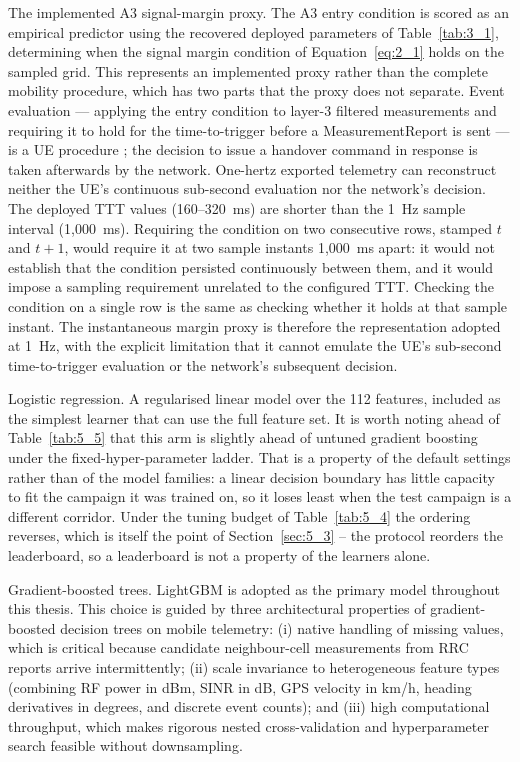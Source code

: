 The implemented A3 signal-margin proxy. The A3 entry condition is scored as an empirical predictor using the recovered deployed parameters of Table~\ref{tab:3_1}, determining when the signal margin condition of Equation~\eqref{eq:2_1} holds on the sampled grid. This represents an implemented proxy rather than the complete mobility procedure, which has two parts that the proxy does not separate. Event evaluation --- applying the entry condition to layer-3 filtered measurements and requiring it to hold for the time-to-trigger before a MeasurementReport is sent --- is a UE procedure \cite{ref1}; the decision to issue a handover command in response is taken afterwards by the network. One-hertz exported telemetry can reconstruct neither the UE's continuous sub-second evaluation nor the network's decision. The deployed TTT values (160--320~ms) are shorter than the 1~Hz sample interval (1,000~ms). Requiring the condition on two consecutive rows, stamped $t$ and $t+1$, would require it at two sample instants 1,000~ms apart: it would not establish that the condition persisted continuously between them, and it would impose a sampling requirement unrelated to the configured TTT. Checking the condition on a single row is the same as checking whether it holds at that sample instant. The instantaneous margin proxy is therefore the representation adopted at 1~Hz, with the explicit limitation that it cannot emulate the UE's sub-second time-to-trigger evaluation or the network's subsequent decision.

Logistic regression. A regularised linear model over the 112 features, included as the simplest learner that can use the full feature set. It is worth noting ahead of Table~\ref{tab:5_5} that this arm is slightly ahead of untuned gradient boosting under the fixed-hyper-parameter ladder. That is a property of the default settings rather than of the model families: a linear decision boundary has little capacity to fit the campaign it was trained on, so it loses least when the test campaign is a different corridor. Under the tuning budget of Table~\ref{tab:5_4} the ordering reverses, which is itself the point of Section~\ref{sec:5_3} -- the protocol reorders the leaderboard, so a leaderboard is not a property of the learners alone.

Gradient-boosted trees. LightGBM \cite{ref32} is adopted as the primary model throughout this thesis. This choice is guided by three architectural properties of gradient-boosted decision trees on mobile telemetry: (i) native handling of missing values, which is critical because candidate neighbour-cell measurements from RRC reports arrive intermittently; (ii) scale invariance to heterogeneous feature types (combining RF power in dBm, SINR in dB, GPS velocity in km/h, heading derivatives in degrees, and discrete event counts); and (iii) high computational throughput, which makes rigorous nested cross-validation and hyperparameter search feasible without downsampling.

